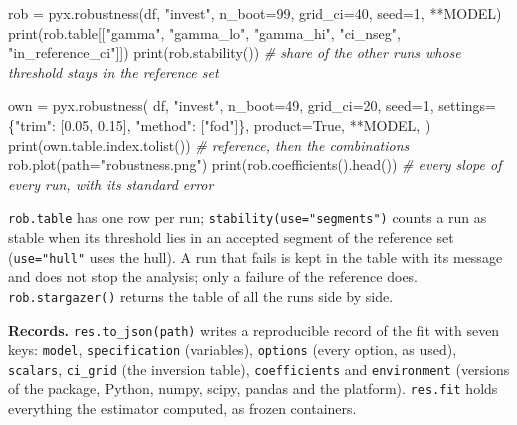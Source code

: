 \documentclass[
  10.5pt,
  a4paper,
]{article}
\newenvironment{Shaded}{}{}
\newcommand{\BuiltInTok}[1]{\textcolor[rgb]{0.00,0.50,0.00}{#1}}
\newcommand{\CommentTok}[1]{\textcolor[rgb]{0.38,0.63,0.69}{\textit{#1}}}
\newcommand{\DecValTok}[1]{\textcolor[rgb]{0.25,0.63,0.44}{#1}}
\newcommand{\FloatTok}[1]{\textcolor[rgb]{0.25,0.63,0.44}{#1}}
\newcommand{\NormalTok}[1]{#1}
\newcommand{\OperatorTok}[1]{\textcolor[rgb]{0.40,0.40,0.40}{#1}}
\newcommand{\StringTok}[1]{\textcolor[rgb]{0.25,0.44,0.63}{#1}}
\newcommand{\VariableTok}[1]{\textcolor[rgb]{0.10,0.09,0.49}{#1}}
\begin{document}
\begin{Shaded}
\begin{Highlighting}[]
\NormalTok{rob }\OperatorTok{=}\NormalTok{ pyx.robustness(df, }\StringTok{"invest"}\NormalTok{, n\_boot}\OperatorTok{=}\DecValTok{99}\NormalTok{, grid\_ci}\OperatorTok{=}\DecValTok{40}\NormalTok{, seed}\OperatorTok{=}\DecValTok{1}\NormalTok{, }\OperatorTok{**}\NormalTok{MODEL)}
\BuiltInTok{print}\NormalTok{(rob.table[[}\StringTok{"gamma"}\NormalTok{, }\StringTok{"gamma\_lo"}\NormalTok{, }\StringTok{"gamma\_hi"}\NormalTok{, }\StringTok{"ci\_nseg"}\NormalTok{, }\StringTok{"in\_reference\_ci"}\NormalTok{]])}
\BuiltInTok{print}\NormalTok{(rob.stability())  }\CommentTok{\# share of the other runs whose threshold stays in the reference set}

\NormalTok{own }\OperatorTok{=}\NormalTok{ pyx.robustness(}
\NormalTok{    df,}
    \StringTok{"invest"}\NormalTok{,}
\NormalTok{    n\_boot}\OperatorTok{=}\DecValTok{49}\NormalTok{,}
\NormalTok{    grid\_ci}\OperatorTok{=}\DecValTok{20}\NormalTok{,}
\NormalTok{    seed}\OperatorTok{=}\DecValTok{1}\NormalTok{,}
\NormalTok{    settings}\OperatorTok{=}\NormalTok{\{}\StringTok{"trim"}\NormalTok{: [}\FloatTok{0.05}\NormalTok{, }\FloatTok{0.15}\NormalTok{], }\StringTok{"method"}\NormalTok{: [}\StringTok{"fod"}\NormalTok{]\},}
\NormalTok{    product}\OperatorTok{=}\VariableTok{True}\NormalTok{,}
    \OperatorTok{**}\NormalTok{MODEL,}
\NormalTok{)}
\BuiltInTok{print}\NormalTok{(own.table.index.tolist())  }\CommentTok{\# reference, then the combinations}
\NormalTok{rob.plot(path}\OperatorTok{=}\StringTok{"robustness.png"}\NormalTok{)}
\BuiltInTok{print}\NormalTok{(rob.coefficients().head())  }\CommentTok{\# every slope of every run, with its standard error}
\end{Highlighting}
\end{Shaded}

\texttt{rob.table} has one row per run;
\texttt{stability(use="segments")} counts a run as stable when its
threshold lies in an accepted segment of the reference set
(\texttt{use="hull"} uses the hull). A run that fails is kept in the
table with its message and does not stop the analysis; only a failure of
the reference does. \texttt{rob.stargazer()} returns the table of all
the runs side by side.

\textbf{Records.} \texttt{res.to\_json(path)} writes a reproducible
record of the fit with seven keys: \texttt{model},
\texttt{specification} (variables), \texttt{options} (every option, as
used), \texttt{scalars}, \texttt{ci\_grid} (the inversion table),
\texttt{coefficients} and \texttt{environment} (versions of the package,
Python, numpy, scipy, pandas and the platform). \texttt{res.fit} holds
everything the estimator computed, as frozen containers.
\end{document}
